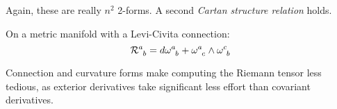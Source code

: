 Again, these are really $ n^2 $ 2-forms. A second \textit{Cartan structure relation} holds.

\begin{theorem}[Cartan]
  On a metric manifold with a Levi-Civita connection:
  \begin{equation}
    \tensor{\mathcal{R}}{^a_b} = \tensor{d\omega}{^a_b} + \tensor{\omega}{^a_c} \wedge \tensor{\omega}{^c_b}
    \label{eq:3.82}
  \end{equation}
\end{theorem}

Connection and curvature forms make computing the Riemann tensor less tedious, as exterior derivatives take significant less effort than covariant derivatives.










